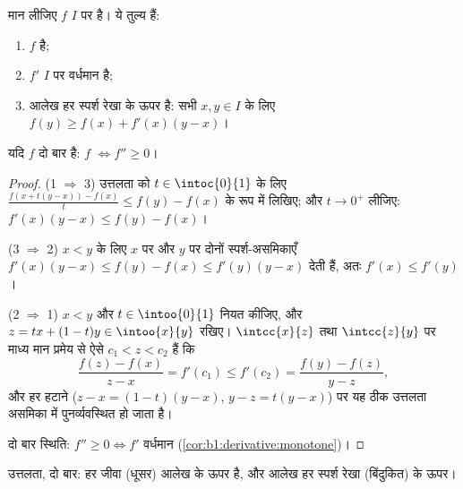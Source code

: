 \begin{theorem}[अवकलीय अभिलक्षण]\label{thm:b1:derivative:convexchar}
मान लीजिए $f$ $I$ पर  है। ये तुल्य हैं:
\begin{enumerate}
  \item $f$  है;
  \item $f'$ $I$ पर वर्धमान है;
  \item आलेख हर स्पर्श रेखा के ऊपर है: सभी $x, y \in I$ के लिए $f(y) \geq
  f(x) + f'(x)(y - x)$।
\end{enumerate}
यदि $f$ दो बार  है: $f$  $\iff f'' \geq 0$।
\end{theorem}

\begin{proof}
(1 $\Rightarrow$ 3) उत्तलता को $t \in \intoc{0}{1}$ के लिए $\frac{f(x +
t(y-x)) - f(x)}{t} \leq f(y) - f(x)$ के रूप में लिखिए; और $t \to 0^+$ लीजिए:
$f'(x)(y - x) \leq f(y) - f(x)$।

(3 $\Rightarrow$ 2) $x < y$ के लिए $x$ पर और $y$ पर दोनों स्पर्श-असमिकाएँ
$f'(x)(y-x) \leq f(y) - f(x) \leq f'(y)(y - x)$ देती हैं, अतः $f'(x) \leq
f'(y)$।

(2 $\Rightarrow$ 1) $x < y$ और $t \in \intoo{0}{1}$ नियत कीजिए, और $z = tx +
(1-t)y \in \intoo{x}{y}$ रखिए। $\intcc{x}{z}$ तथा $\intcc{z}{y}$ पर माध्य
मान प्रमेय से ऐसे $c_1 < z < c_2$ हैं कि
\[
\frac{f(z) - f(x)}{z - x} = f'(c_1) \leq f'(c_2)
= \frac{f(y) - f(z)}{y - z} ,
\]
और हर हटाने ($z - x = (1-t)(y-x)$, $y - z = t(y-x)$) पर यह ठीक उत्तलता
असमिका में पुनर्व्यवस्थित हो जाता है।

दो बार  स्थिति: $f'' \geq 0 \iff f'$ वर्धमान
(\cref{cor:b1:derivative:monotone})।
\end{proof}

\begin{omfigure}

{\small उत्तलता, दो बार: हर जीवा (धूसर) आलेख के ऊपर है, और आलेख हर स्पर्श
रेखा (बिंदुकित) के ऊपर।}
\end{omfigure}

